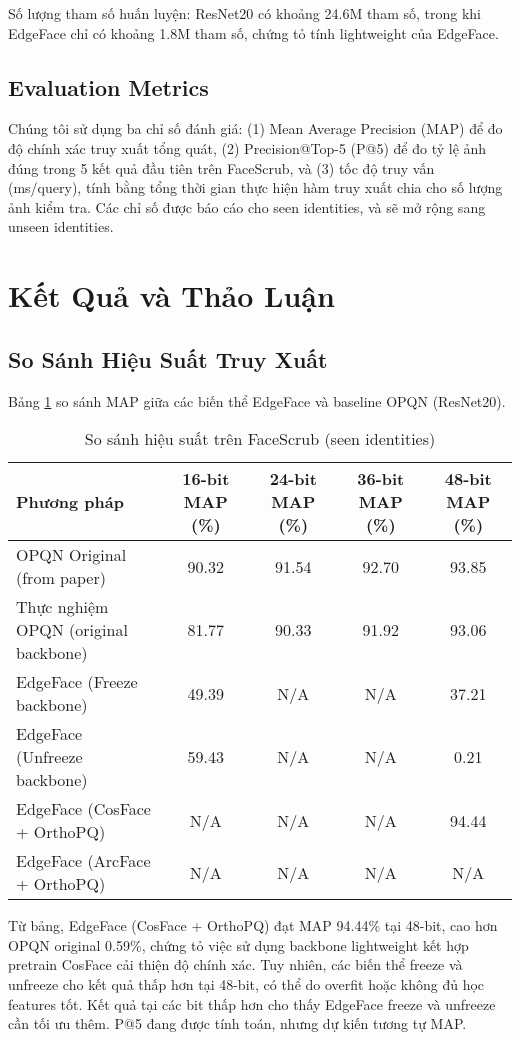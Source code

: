 Số lượng tham số huấn luyện: ResNet20 có khoảng 24.6M tham số, trong khi EdgeFace chỉ có khoảng 1.8M tham số, chứng tỏ tính lightweight của EdgeFace.

\subsection{Evaluation Metrics}
Chúng tôi sử dụng ba chỉ số đánh giá: (1) Mean Average Precision (MAP) để đo độ chính xác truy xuất tổng quát, (2) Precision@Top-5 (P@5) để đo tỷ lệ ảnh đúng trong 5 kết quả đầu tiên trên FaceScrub, và (3) tốc độ truy vấn (ms/query), tính bằng tổng thời gian thực hiện hàm truy xuất chia cho số lượng ảnh kiểm tra. Các chỉ số được báo cáo cho seen identities, và sẽ mở rộng sang unseen identities.

\section{Kết Quả và Thảo Luận}

\subsection{So Sánh Hiệu Suất Truy Xuất}
Bảng \ref{tab:map} so sánh MAP giữa các biến thể EdgeFace và baseline OPQN (ResNet20).

\begin{table}[htbp]
\centering
\caption{So sánh hiệu suất trên FaceScrub (seen identities)}
\label{tab:map}
\begin{tabular}{l|c|c|c|c}
\hline
Phương pháp & 16-bit MAP (\%) & 24-bit MAP (\%) & 36-bit MAP (\%) & 48-bit MAP (\%) \\
\hline
OPQN Original (from paper) & 90.32 & 91.54 & 92.70 & 93.85 \\
Thực nghiệm OPQN (original backbone) & 81.77 & 90.33 & 91.92 & 93.06 \\
EdgeFace (Freeze backbone) & 49.39 & N/A & N/A & 37.21 \\
EdgeFace (Unfreeze backbone) & 59.43 & N/A & N/A & 0.21 \\
EdgeFace (CosFace + OrthoPQ) & N/A & N/A & N/A & 94.44 \\
EdgeFace (ArcFace + OrthoPQ) & N/A & N/A & N/A & N/A \\
\hline
\end{tabular}
\end{table}

Từ bảng, EdgeFace (CosFace + OrthoPQ) đạt MAP 94.44\% tại 48-bit, cao hơn OPQN original 0.59\%, chứng tỏ việc sử dụng backbone lightweight kết hợp pretrain CosFace cải thiện độ chính xác. Tuy nhiên, các biến thể freeze và unfreeze cho kết quả thấp hơn tại 48-bit, có thể do overfit hoặc không đủ học features tốt. Kết quả tại các bit thấp hơn cho thấy EdgeFace freeze và unfreeze cần tối ưu thêm. P@5 đang được tính toán, nhưng dự kiến tương tự MAP.

